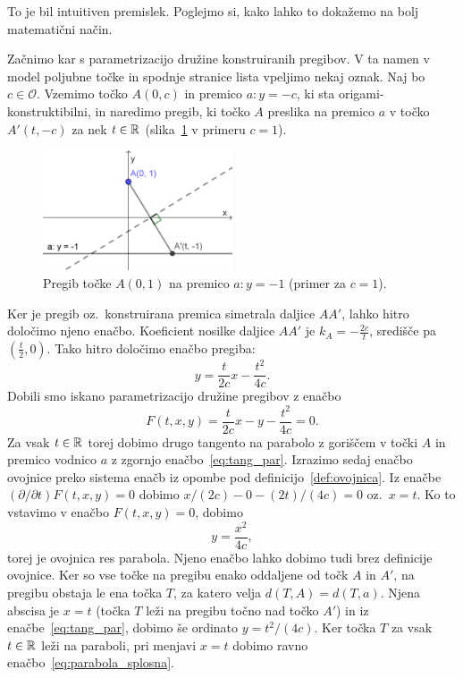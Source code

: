 To je bil intuitiven premislek. Poglejmo si, kako lahko to dokažemo na bolj matematični način.

Začnimo kar s parametrizacijo družine konstruiranih pregibov. V ta namen v model poljubne točke in spodnje stranice lista vpeljimo nekaj oznak. Naj bo $c \in \mathcal{O}$. Vzemimo točko $A(0, c)$ in premico $a: y = -c$, ki sta origami-konstruktibilni, in naredimo pregib, ki točko $A$ preslika na premico $a$ v točko $A'(t, -c)$ za nek $t \in \mathbb R$ (slika~\ref{fig:enacba_tangente_par1} v primeru $c = 1$).

\begin{figure}[h]
    \centering
    \includegraphics[width=0.5\textwidth]{images/enacba_parabole1.png}
    \caption[Enačba tangente na parabolo]{Pregib točke $A(0, 1)$ na premico $a: y = -1$ (primer za $c = 1$).}
    \label{fig:enacba_tangente_par1}
\end{figure}

Ker je pregib oz.\ konstruirana premica simetrala daljice $AA'$, lahko hitro določimo njeno enačbo. Koeficient nosilke daljice $AA'$ je $k_A = -\frac{2c}{t}$, središče pa $(\frac{t}{2}, 0)$. Tako hitro določimo enačbo pregiba:
\begin{equation}
    y = \frac{t}{2c} x - \frac{t^2}{4c}.
    \label{eq:tang_par}
\end{equation}
Dobili smo iskano parametrizacijo družine pregibov z enačbo
$$F(t, x, y) = \frac{t}{2c} x - y - \frac{t^2}{4c} = 0. $$
Za vsak $t \in \mathbb R$ torej dobimo drugo tangento na parabolo z goriščem v točki $A$ in premico vodnico $a$ z zgornjo enačbo~\ref{eq:tang_par}. Izrazimo sedaj enačbo ovojnice preko sistema enačb iz opombe pod definicijo~\ref{def:ovojnica}. Iz enačbe $(\partial / \partial t) F(t, x, y) = 0$ dobimo $x/(2c) - 0 - (2t)/(4c) = 0$ oz.\ $x = t$. Ko to vstavimo v enačbo $F(t, x, y) = 0$, dobimo
\begin{equation}
    \label{eq:parabola_splosna}
    y = \frac{x^2}{4c},
\end{equation}
torej je ovojnica res parabola. Njeno enačbo lahko dobimo tudi brez definicije ovojnice. Ker so vse točke na pregibu enako oddaljene od točk $A$ in $A'$, na pregibu obstaja le ena točka $T$, za katero velja $d(T, A) = d(T, a)$. Njena abscisa je $x = t$ (točka $T$ leži na pregibu točno nad točko $A'$) in iz enačbe~\ref{eq:tang_par}, dobimo še ordinato $y = t^2/(4c)$. Ker točka $T$ za vsak $t \in \mathbb R$ leži na paraboli, pri menjavi $x = t$ dobimo ravno enačbo~\ref{eq:parabola_splosna}.

